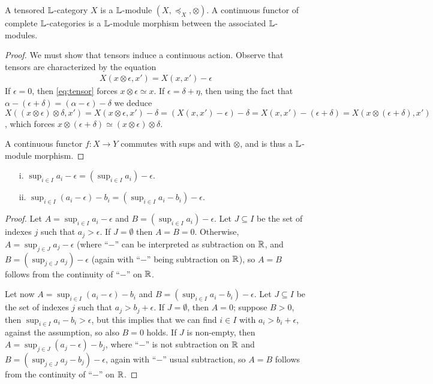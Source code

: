 \begin{proposition}
A tensored $\mathbb{L}$-category $X$ is a $\mathbb{L}$-module $(X, \preceq_{X}, \otimes)$.
A continuous functor of complete $\mathbb{L}$-categories is a $\mathbb{L}$-module morphism between the associated $\mathbb{L}$-modules.
\end{proposition}
\begin{proof}
We must show that tensors induce a continuous action. Observe that tensors are characterized by the equation 
\begin{align}\label{eq:tensor}
X(x\otimes \epsilon, x') = X(x,x') -\epsilon
\end{align}
If $\epsilon=0$, then \eqref{eq:tensor} forces $x\otimes \epsilon\simeq x$. 
If $\epsilon=\delta+\eta$, then using the fact that $\alpha-(\epsilon+\delta)=(\alpha-\epsilon)-\delta$ 
we deduce $X((x\otimes \epsilon)\otimes \delta, x')=X(x\otimes \epsilon, x')-\delta=(X(x,x')-\epsilon)-\delta=X(x,x')-(\epsilon+\delta)=X(x\otimes (\epsilon+\delta),x')$, which forces $x\otimes(\epsilon+\delta)\simeq (x\otimes \epsilon)\otimes \delta$.

A continuous functor $f:X\to Y$ commutes with sups and with $\otimes$, and is thus a $\mathbb{L}$-module morphism.
\end{proof}


\begin{lemma}
\begin{itemize}
\item[i.] $\sup_{i\in I}a_{i}-\epsilon= (\sup_{i\in I}a_{i})-\epsilon$.
\item[ii.] $\sup_{i\in I}(a_{i}-\epsilon)-b_{i}= (\sup_{i\in I}a_{i}-b_{i})-\epsilon$.


\end{itemize}
\end{lemma}
\begin{proof}
Let $A= \sup_{i\in I}a_{i}-\epsilon$ and $B= (\sup_{i\in I}a_{i})-\epsilon$.
Let $J\subseteq I$ be the set of indexes $j$ such that $a_{j}>\epsilon$. 
If $J=\emptyset$ then $A=B=0$. Otherwise, 
$A= \sup_{j\in J}a_{j}-\epsilon$ (where ``$-$'' can be interpreted as subtraction on $\mathbb{R}$, and 
$B= (\sup_{j\in J}a_{j})-\epsilon$ (again with ``$-$'' being subtraction on $\mathbb{R}$), so $A=B$ follows from the continuity of ``$-$'' on $\mathbb{R}$.

Let now $A= \sup_{i\in I}(a_{i}-\epsilon)-b_{i}$ and $B= (\sup_{i\in I}a_{i}-b_{i})-\epsilon$.
Let $J\subseteq I$ be the set of indexes $j$ such that $a_{j}> b_{j}+\epsilon$.
If $J=\emptyset$, then $A=0$; suppose $B>0$, then $\sup_{i\in I}a_{i}-b_{i}>\epsilon$, but this implies that we can find $i\in I$ with $a_{i}>b_{i}+\epsilon$, against the assumption, so also $B=0$ holds. If $J$ is non-empty, then 
$A= \sup_{j\in J}(a_{j}-\epsilon)-b_{j}$, where ``$-$'' is not subtraction on $\mathbb{R}$ and 
$B= (\sup_{j\in J}a_{j}-b_{j})-\epsilon$, again with ``$-$'' usual subtraction, so $A=B$ follows from the continuity of ``$-$'' on $\mathbb{R}$.
 \end{proof}


